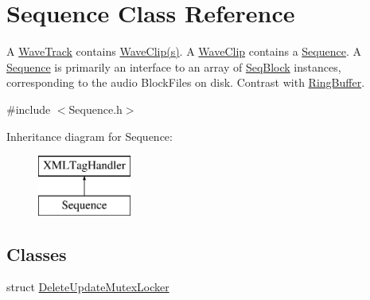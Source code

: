 \hypertarget{class_sequence}{}\section{Sequence Class Reference}
\label{class_sequence}


A \hyperlink{class_wave_track}{Wave\+Track} contains \hyperlink{class_wave_clip}{Wave\+Clip(s)}. A \hyperlink{class_wave_clip}{Wave\+Clip} contains a \hyperlink{class_sequence}{Sequence}. A \hyperlink{class_sequence}{Sequence} is primarily an interface to an array of \hyperlink{class_seq_block}{Seq\+Block} instances, corresponding to the audio Block\+Files on disk. Contrast with \hyperlink{class_ring_buffer}{Ring\+Buffer}.  




{\ttfamily \#include $<$Sequence.\+h$>$}

Inheritance diagram for Sequence\+:\begin{figure}[H]
\begin{center}
\leavevmode
\includegraphics[height=2.000000cm]{class_sequence}
\end{center}
\end{figure}
\subsection*{Classes}
\begin{DoxyCompactItemize}
\item 
struct \hyperlink{struct_sequence_1_1_delete_update_mutex_locker}{Delete\+Update\+Mutex\+Locker}
\end{DoxyCompactItemize}
